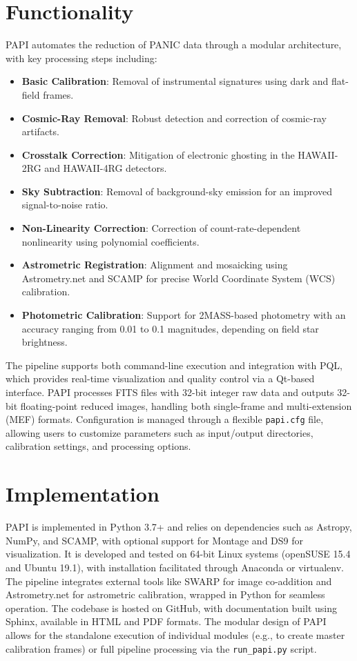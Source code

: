 \documentclass[10pt]{article}
\begin{document}
\section*{Functionality}

PAPI automates the reduction of PANIC data through a modular architecture, with key processing steps including:

\begin{itemize}
  \item \textbf{Basic Calibration}: Removal of instrumental signatures using dark and flat-field frames.
  \item \textbf{Cosmic-Ray Removal}: Robust detection and correction of cosmic-ray artifacts.
  \item \textbf{Crosstalk Correction}: Mitigation of electronic ghosting in the HAWAII-2RG and HAWAII-4RG detectors.
  \item \textbf{Sky Subtraction}: Removal of background-sky emission for an improved signal-to-noise ratio.
  \item \textbf{Non-Linearity Correction}: Correction of count-rate-dependent nonlinearity using polynomial coefficients.
  \item \textbf{Astrometric Registration}: Alignment and mosaicking using Astrometry.net and SCAMP for precise World Coordinate System (WCS) calibration.
  \item \textbf{Photometric Calibration}: Support for 2MASS-based photometry with an accuracy ranging from 0.01 to 0.1 magnitudes, depending on field star brightness. \cite{cardenas2017panic}
\end{itemize}

The pipeline supports both command-line execution and integration with PQL, which provides real-time visualization and quality control via a Qt-based interface. PAPI processes FITS files with 32-bit integer raw data and outputs 32-bit floating-point reduced images, handling both single-frame and multi-extension (MEF) formats. Configuration is managed through a flexible \texttt{papi.cfg} file, allowing users to customize parameters such as input/output directories, calibration settings, and processing options. \cite{papi_docs}

\section*{Implementation}

PAPI is implemented in Python 3.7+ and relies on dependencies such as Astropy, NumPy, and SCAMP, with optional support for Montage and DS9 for visualization. It is developed and tested on 64-bit Linux systems (openSUSE 15.4 and Ubuntu 19.1), with installation facilitated through Anaconda or virtualenv. The pipeline integrates external tools like SWARP for image co-addition and Astrometry.net for astrometric calibration, wrapped in Python for seamless operation. The codebase is hosted on GitHub, with documentation built using Sphinx, available in HTML and PDF formats. The modular design of PAPI allows for the standalone execution of individual modules (e.g., to create master calibration frames) or full pipeline processing via the \texttt{run_papi.py} script. \cite{papi_docs}
\end{document}
